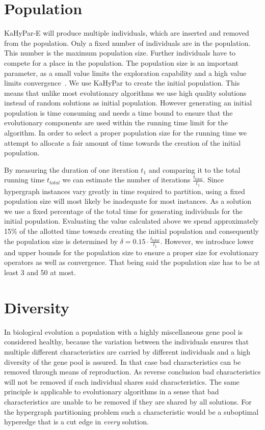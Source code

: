 \documentclass[a4paper,12pt,titlepage, BCOR7mm,headsepline]{scrbook}
\numberwithin{equation}{section}
\begin{document}
\section{Population}
\label{sec:population}
KaHyPar-E will produce multiple individuals, which are inserted and removed from the population. Only a fixed number of
individuals are in the population. This number is the maximum population size. Further individuals have to compete for a place in the population. 
The population size is an important parameter, as a small value limits the exploration capability and a high value limits convergence~\cite{chen2012large}.
We use KaHyPar to create the initial population. This means that unlike most evolutionary algorithms we use high quality solutions instead of random solutions as initial population. However generating an initial population is time consuming and needs a time bound to ensure that the evolutionary components are used within the running time limit for the algorithm.
In order to select a proper population size for the running time we attempt to allocate a fair amount of time towards the creation of the initial population. 

By measuring the duration of one iteration $t_1$ and comparing it to the total running time ${t_{total}}$ we can estimate the number of iterations $\frac{t_{total}}{t_1}$. Since hypergraph instances
vary greatly in time required to partition, using a fixed population size will most likely be inadequate for most instances. As a solution we use a fixed percentage of the total time for generating 
individuals for the initial population. Evaluating the value calculated above we spend approximately 15\% of the allotted time towards creating the initial population and consequently the population size is determined by $\delta = 0.15\cdot\frac{t_{total}}{t_1}$.
However, we introduce lower and upper bounds for the population size to ensure a proper size for evolutionary operators as well as convergence. That being said the population size has to be at least 3 and 50 at most.
\section{Diversity}
\label{sec:diversity}
In biological evolution a population with a highly miscellaneous gene pool is considered healthy, because the variation between the individuals ensures that multiple different characteristics are carried by different individuals and a high diversity of the gene pool is assured. In that case bad characteristics can be removed through means of reproduction. As reverse conclusion bad characteristics will not be removed if each individual shares said characteristics. 
The same principle is applicable to evolutionary algorithms in a sense that bad characteristics are unable to be removed if they are shared by all solutions. For the hypergraph partitioning problem such a characteristic would be a suboptimal hyperedge that is a cut edge in \emph{every} solution. 
\end{document}
